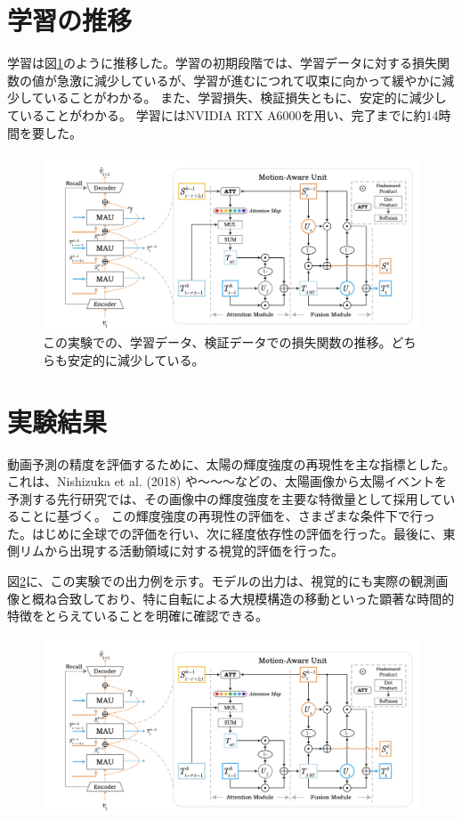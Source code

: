   \section{学習の推移}
  学習は図\ref{fig:exp1_learn_progress}のように推移した。学習の初期段階では、学習データに対する損失関数の値が急激に減少しているが、学習が進むにつれて収束に向かって緩やかに減少していることがわかる。
  また、学習損失、検証損失ともに、安定的に減少していることがわかる。
  学習にはNVIDIA RTX A6000を用い、完了までに約14時間を要した。
  \begin{figure}[h]
    \centering
    \includegraphics[width=150mm]{figures/mau.png}
    \caption{この実験での、学習データ、検証データでの損失関数の推移。どちらも安定的に減少している。}
    \label{fig:exp1_learn_progress}
  \end{figure}

  \section{実験結果}
    動画予測の精度を評価するために、太陽の輝度強度の再現性を主な指標とした。
    これは、Nishizuka et al. (2018) \cite{nishizuka2018deep} や〜〜〜などの、太陽画像から太陽イベントを予測する先行研究では、その画像中の輝度強度を主要な特徴量として採用していることに基づく。
    この輝度強度の再現性の評価を、さまざまな条件下で行った。はじめに全球での評価を行い、次に経度依存性の評価を行った。最後に、東側リムから出現する活動領域に対する視覚的評価を行った。

    図\ref{fig:exp1_out}に、この実験での出力例を示す。モデルの出力は、視覚的にも実際の観測画像と概ね合致しており、特に自転による大規模構造の移動といった顕著な時間的特徴をとらえていることを明確に確認できる。
    
    \begin{figure}[h]
      \centering
      \includegraphics[width=150mm]{figures/mau.png}
      \caption{}
      \label{fig:exp1_out}
    \end{figure}

